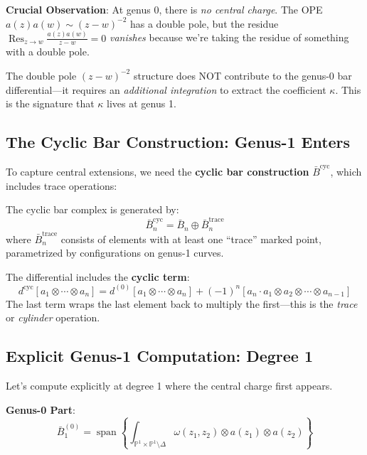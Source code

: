 \textbf{Crucial Observation}: At genus 0, there is \emph{no central charge}. The OPE $a(z)a(w) \sim (z-w)^{-2}$ has a double pole, but the residue $\operatorname{Res}_{z \to w} \frac{a(z)a(w)}{z-w} = 0$ \emph{vanishes} because we're taking the residue of something with a double pole.

The double pole $(z-w)^{-2}$ structure does NOT contribute to the genus-0 bar differential---it requires an \emph{additional integration} to extract the coefficient $\kappa$. This is the signature that $\kappa$ lives at genus 1.

\subsection{The Cyclic Bar Construction: Genus-1 Enters}

To capture central extensions, we need the \textbf{cyclic bar construction} $\bar{B}^{\text{cyc}}$, which includes trace operations:

\begin{definition}
The cyclic bar complex is generated by:
\begin{equation}
\bar{B}^{\text{cyc}}_n = \bar{B}_n \oplus \bar{B}^{\text{trace}}_n
\end{equation}
where $\bar{B}^{\text{trace}}_n$ consists of elements with at least one ``trace'' marked point, parametrized by configurations on genus-1 curves.

The differential includes the \textbf{cyclic term}:
\begin{equation}
d^{\text{cyc}}[a_1 \otimes \cdots \otimes a_n] = d^{(0)}[a_1 \otimes \cdots \otimes a_n] + (-1)^n [a_n \cdot a_1 \otimes a_2 \otimes \cdots \otimes a_{n-1}]
\end{equation}
The last term wraps the last element back to multiply the first---this is the \emph{trace} or \emph{cylinder} operation.
\end{definition}

\subsection{Explicit Genus-1 Computation: Degree 1}

Let's compute explicitly at degree 1 where the central charge first appears.

\textbf{Genus-0 Part}:
\begin{equation}
\bar{B}^{(0)}_1 = \operatorname{span}\left\{ \int_{\mathbb{P}^1 \times \mathbb{P}^1 \setminus \Delta} \omega(z_1, z_2) \otimes a(z_1) \otimes a(z_2) \right\}
\end{equation}

